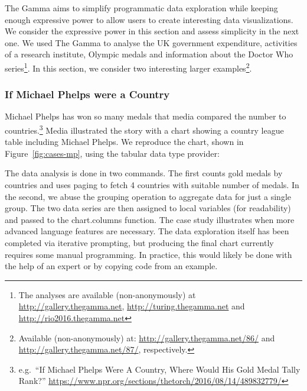 \documentclass[manuscript,review,anonymous]{acmart}
\newcommand{\kvd}[1]{\textbf{#1}}
\newcommand{\ikvd}[1]{{\fontfamily{zi4}\selectfont\small #1}}
\begin{document}
The Gamma aims to simplify programmatic data exploration while keeping enough expressive power
to allow users to create interesting data visualizations. We consider the expressive power in
this section and assess simplicity in the next one. We used The Gamma to analyse
the UK government expenditure, activities of a research institute, Olympic medals and
information about the Doctor Who series\footnote{The analyses are available (non-anonymously)
at \url{http://gallery.thegamma.net}, \url{http://turing.thegamma.net} and \url{http://rio2016.thegamma.net}}.
In this section, we consider two interesting larger examples\footnote{Available
(non-anonymously) at: \url{http://gallery.thegamma.net/86/} and  \url{http://gallery.thegamma.net/87/}, respectively.}.

\subsubsection*{If Michael Phelps were a Country}
Michael Phelps has won so many medals that media compared the number to
countries.\footnote{e.g.~``If Michael Phelps Were A Country, Where Would His Gold Medal Tally Rank?''
 \url{https://www.npr.org/sections/thetorch/2016/08/14/489832779/}}
Media illustrated the story with a chart showing a country league table including Michael Phelps.
We reproduce the chart, shown in Figure~\ref{fig:cases-mp}, using the tabular data type provider:


\noindent
The data analysis is done in two commands. The first counts gold medals by countries
and uses paging to fetch 4 countries with suitable number of medals. In the second, we abuse the
grouping operation to aggregate data for just a single group. The two data series are then assigned
to local variables (for readability) and passed to the \ikvd{chart.columns} function.
The case study illustrates when more advanced language features are necessary. The data exploration
itself has been completed via iterative prompting, but producing the final chart currently requires
some manual programming. In practice, this would likely be done with the help of an expert
or by copying code from an example.
\end{document}
